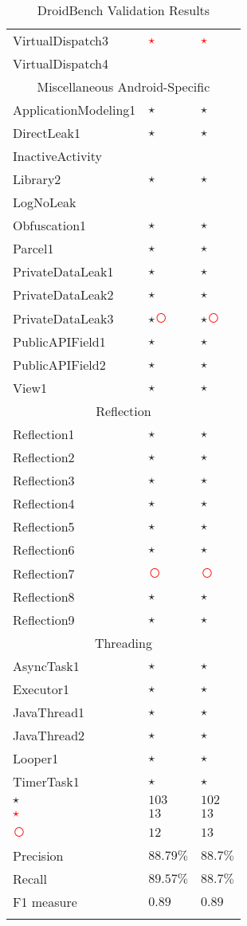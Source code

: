 \documentclass[../draft.tex]{subfiles}
\newcommand{\fp}{\textcolor{white}{\textcircled{\textcolor{red}{$\star$}}}}
\newcommand{\fn}{\textcolor{red}{\textcircled{ }}}
\newcommand{\tp}[0]{\textcircled{$\star$}}
\newcommand{\tsub}[1]{\multicolumn{3}{c}{#1}\\\hline}
\begin{document}
\begin{longtable}{l | l | l}
        VirtualDispatch3 & \fp & \fp\\
        VirtualDispatch4 & &\\
        \hline
        \tsub{Miscellaneous Android-Specific}
        ApplicationModeling1 & \tp & \tp\\
        DirectLeak1 & \tp & \tp\\
        InactiveActivity &  & \\
        Library2 & \tp & \tp\\
        LogNoLeak & & \\
        Obfuscation1 & \tp & \tp\\
        Parcel1 & \tp & \tp\\
        PrivateDataLeak1 & \tp & \tp\\
        PrivateDataLeak2 & \tp & \tp\\
        PrivateDataLeak3 & \tp \fn & \tp \fn\\
        PublicAPIField1 & \tp & \tp\\
        PublicAPIField2 & \tp & \tp\\
        View1 & \tp & \tp\\
        \hline
        \tsub{Reflection}
        Reflection1 & \tp & \tp\\
        Reflection2 & \tp & \tp\\
        Reflection3 & \tp & \tp\\
        Reflection4 & \tp & \tp\\
        Reflection5 & \tp & \tp\\
        Reflection6 & \tp & \tp\\
        Reflection7 & \fn & \fn\\
        Reflection8 & \tp & \tp\\
        Reflection9 & \tp & \tp\\
        \hline
        \tsub{Threading}
        AsyncTask1 & \tp & \tp\\
        Executor1 & \tp & \tp\\
        JavaThread1 & \tp & \tp\\
        JavaThread2 & \tp & \tp\\
        Looper1 & \tp & \tp\\
        TimerTask1 & \tp & \tp\\
        \hline\hline  %
        \tp &$ 103 $&$ 102 $\\
        \fp &$ 13 $&$ 13 $\\
        \fn &$ 12 $&$ 13 $\\
        Precision & $ 88.79 \%$ & $ 88.7 \%$\\
        Recall & $ 89.57 \% $ & $ 88.7 \%$\\
        F1 measure & $ 0.89 $ & $ 0.89 $\\
        \caption{DroidBench Validation Results}
        \label{t:droidbenchvalidation}
    \end{longtable}
\end{document}
